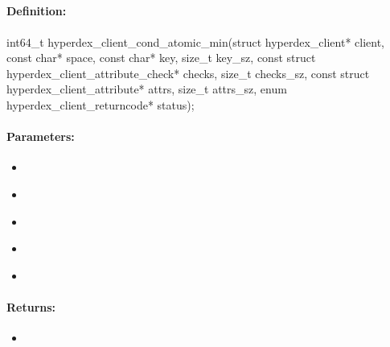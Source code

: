 \pagebreak
\subsection{}
\label{api:c:cond_atomic_min}


\paragraph{Definition:}
\begin{ccode}
int64_t hyperdex_client_cond_atomic_min(struct hyperdex_client* client,
        const char* space,
        const char* key, size_t key_sz,
        const struct hyperdex_client_attribute_check* checks, size_t checks_sz,
        const struct hyperdex_client_attribute* attrs, size_t attrs_sz,
        enum hyperdex_client_returncode* status);
\end{ccode}

\paragraph{Parameters:}
\begin{itemize}[noitemsep]
\item {}\\

\item {}\\

\item {}\\

\item {}\\

\item {}\\

\end{itemize}

\paragraph{Returns:}
\begin{itemize}[noitemsep]
\item {}\\

\end{itemize}

